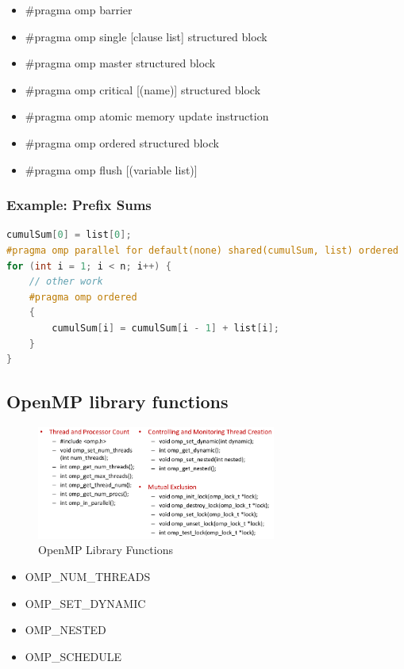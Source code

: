 \begin{itemize}
\tightlist
\item
  \#pragma omp barrier
\item
  \#pragma omp single {[}clause list{]} structured block
\item
  \#pragma omp master structured block
\item
  \#pragma omp critical {[}(name){]} structured block
\item
  \#pragma omp atomic memory update instruction
\item
  \#pragma omp ordered structured block
\item
  \#pragma omp flush {[}(variable list){]}
\end{itemize}

\hypertarget{example-prefix-sums}{%
\subsubsection{Example: Prefix Sums}\label{example-prefix-sums}}

 \begin{lstlisting}[language=C++]
cumulSum[0] = list[0];
#pragma omp parallel for default(none) shared(cumulSum, list) ordered
for (int i = 1; i < n; i++) {
    // other work
    #pragma omp ordered
    {
        cumulSum[i] = cumulSum[i - 1] + list[i];
    }
}
\end{lstlisting}

\hypertarget{openmp-library-functions}{%
\subsection{OpenMP library functions}\label{openmp-library-functions}}

\begin{figure}[H]
\centering
\includegraphics[width=0.7\textwidth]{figures/openMp-Library-Function.png}
\caption{OpenMP Library Functions}
\end{figure}

\begin{itemize}
\tightlist
\item
  OMP\_NUM\_THREADS
\item
  OMP\_SET\_DYNAMIC
\item
  OMP\_NESTED
\item
  OMP\_SCHEDULE
\end{itemize}

\clearpage